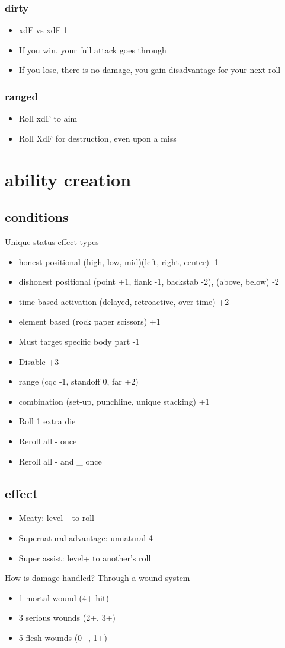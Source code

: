 \documentclass[10pt,letterpaper]{article}
\begin{document}
	\subsubsection{dirty}
	\begin{itemize}
		\item  xdF vs xdF-1
		\item  If you win, your full attack goes through
		\item  If you lose, there is no damage, you gain disadvantage for your next roll
	\end{itemize}
	\subsubsection{ranged}
	\begin{itemize}
		\item  Roll xdF to aim
		\item  Roll XdF for destruction, even upon a miss
	\end{itemize}
	\section{ability creation}
	\subsection{conditions}
	Unique status effect types 
	\begin{itemize}
		\item honest positional (high, low, mid)(left, right, center) -1
		\item dishonest positional (point +1, flank -1, backstab -2), (above, below) -2
		\item time based activation (delayed, retroactive, over time) +2
		\item element based (rock paper scissors) +1
		\item Must target specific body part -1
		\item Disable +3
		\item range (cqc -1, standoff 0, far +2)
		\item combination (set-up, punchline, unique stacking) +1
		
		\item Roll 1 extra die
		\item Reroll all - once
		\item Reroll all - and \_ once
	\end{itemize}
	
	\subsection{effect}
	\begin{itemize}
		\item  Meaty: level+ to roll
		\item  Supernatural advantage: unnatural 4+
		\item  Super assist: level+ to another's roll
	\end{itemize}

	How is damage handled?
	Through a wound system
	\begin{itemize}
		\item 1 mortal wound (4+ hit)
		\item 3 serious wounds (2+, 3+)
		\item 5 flesh wounds (0+, 1+)
	\end{itemize}
	
	
	
\end{document}
